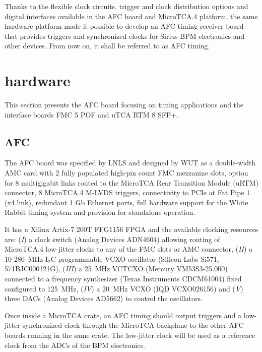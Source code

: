 \documentclass[a4paper,
               biblatex,      %
               ]{jacow}
\begin{document}
Thanks to the flexible clock circuits, trigger and clock distribution options and digital interfaces available in the AFC board and MicroTCA.4 platform, the same hardware platform made it possible to develop an AFC timing receiver board that provides triggers and synchronized clocks for Sirius BPM electronics and other devices. From now on, it shall be referred to as AFC timing. 

\section{hardware}
This section presents the AFC board focusing on timing applications and the interface boards FMC 5 POF and uTCA RTM 8 SFP+.

\subsection{AFC}

The AFC board was specified by LNLS and designed by WUT as a double-width AMC card with 2 fully populated high-pin count FMC mezzanine slots, option for 8 multigigabit links routed to the MicroTCA Rear Transition Module (uRTM) connector, 8 MicroTCA.4 M-LVDS triggers, connectivity to PCIe at Fat Pipe 1 (x4 link), redundant 1 Gb Ethernet ports, full hardware support for the White Rabbit timing system and provision for standalone operation. 

It has a Xilinx Artix-7 200T FFG1156 FPGA and the available clocking resources are: (\textit{I}) a clock switch (Analog Devices ADN4604) allowing routing of MicroTCA.4 low-jitter clocks to any of the FMC slots or AMC connector, (\textit{II}) a 10-280~MHz I$_{2}$C programmable VCXO oscillator (Silicon Labs Si571, 571BJC000121G), (\textit{III}) a 25~MHz VCTCXO (Mercury VM53S3-25.000) connected to a frequency synthesizer (Texas Instruments CDCM61004) fixed configured to 125~MHz, (\textit{IV}) a 20~MHz VCXO (IQD VCXO026156) and (\textit{V}) three DACs (Analog Devices AD5662) to control the oscillators. 

Once inside a MicroTCA crate, an AFC timing should output triggers and a low-jitter synchronized clock through the MicroTCA backplane to the other AFC boards running in the same crate. The low-jitter clock will be used as a reference clock from the ADCs of the BPM electronics.
\end{document}
